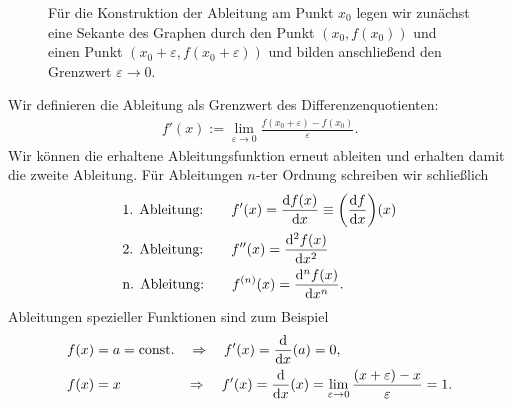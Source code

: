 \begin{figure}[htp]
    \centering
    \caption{Für die Konstruktion der Ableitung am Punkt $x_0$ legen wir zunächst eine Sekante des Graphen durch den Punkt $(x_0, f(x_0))$ und einen Punkt $(x_0 + \varepsilon, f(x_0+\varepsilon))$ und bilden anschließend den Grenzwert $\varepsilon \to 0$.} 
\end{figure}

Wir definieren die Ableitung als Grenzwert des Differenzenquotienten: 
\begin{align}
    f'(x) := \lim_{\varepsilon \to 0} \frac{f(x_0 + \varepsilon)-f(x_0)}{\varepsilon}.
\end{align}
Wir können die erhaltene Ableitungsfunktion erneut ableiten und erhalten damit die zweite Ableitung. Für Ableitungen $n$-ter Ordnung schreiben wir schließlich 
\begin{align}
    &\text{1. Ableitung:} \qquad f'(x) = \dv{f(x)}{x} \equiv \qty(\dv{f}{x})(x) \notag \\
    &\text{2. Ableitung:} \qquad f''(x) = \dv[2]{f(x)}{x} \notag \\
    &\text{n. Ableitung:} \qquad f^{(n)}(x) = \dv[n]{f(x)}{x}.
\end{align}
Ableitungen spezieller Funktionen sind zum Beispiel 
\begin{align}
    \begin{split}
        f(x) &= a =\text{const.} \quad \Rightarrow \quad f'(x) = \dv{x}(a) = 0, \\
        f(x) &= x \hphantom{= const.} \quad \Rightarrow \quad f'(x) = \dv{x}(x) = \lim_{\varepsilon \to 0} \frac{(x+\varepsilon) - x }{\varepsilon} = 1.
    \end{split}
\end{align}

